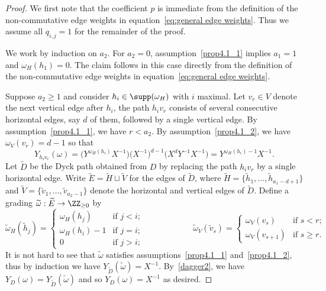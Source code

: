 \begin{proof}
 We first note that the coefficient $p$ is immediate from the definition of the non-commutative edge weights in equation~\eqref{eq:general edge weights}. 
 Thus we assume all $q_{i,j}=1$ for the remainder of the proof.

 We work by induction on $a_2$. 
 For $a_2=0$, assumption~\ref{prop4.1_1} implies $a_1=1$ and $\omega_H(h_1)=0$. 
 The claim follows in this case directly from the definition of the non-commutative edge weights in equation~\eqref{eq:general edge weights}.

 Suppose $a_2\ge1$ and consider $h_i\in\supp(\omega_H)$ with $i$ maximal.
 Let $v_r\in V$ denote the next vertical edge after $h_i$, \ie the path $h_iv_r$ consists of several consecutive horizontal edges, say $d$ of them, followed by a single vertical edge.
 By assumption~\ref{prop4.1_1}, we have $r<a_2$.
 By assumption~\ref{prop4.1_2}, we have $\omega_V(v_r)=d-1$ so that 
 \begin{equation}\label{dagger2}
 \tag{$\dagger$}
 Y_{h_iv_r}(\omega)=\big(Y^{\omega_H(h_i)}X^{-1}\big)\big(X^{-1}\big)^{d-1}\big(X^dY^{-1}X^{-1}\big)=Y^{\omega_H(h_i)-1}X^{-1}.
 \end{equation}
 Let $\widetilde D$ be the Dyck path obtained from $D$ by replacing the path $h_iv_r$ by a single horizontal edge.
 Write $\widetilde E=\widetilde H\sqcup\widetilde V$ for the edges of $\widetilde D$, where $\widetilde H=\{\tilde h_1,\ldots,\tilde h_{a_1-d+1}\}$ and $\widetilde V=\{\tilde v_1,\ldots,\tilde v_{a_2-1}\}$ denote the horizontal and vertical edges of $\widetilde D$.
 Define a grading $\widetilde\omega:\widetilde E\to\ZZ_{\ge0}$ by
 \[\widetilde\omega_H(\tilde h_j)=\begin{cases} \omega_H(h_j) & \text{if $j<i$;}\\ \omega_H(h_i)-1 & \text{if $j=i$;}\\ 0 & \text{if $j>i$;}\end{cases}
 \hspace{1in}
 \widetilde\omega_V(\tilde v_s)=\begin{cases} \omega_V(v_s) & \text{if $s<r$;}\\ \omega_V(v_{s+1}) & \text{if $s\ge r$.}\end{cases}\]
 It is not hard to see that $\widetilde\omega$ satisfies assumptions~\ref{prop4.1_1} and~\ref{prop4.1_2}, thus by induction we have $Y_{\widetilde D}(\widetilde\omega)=X^{-1}$.
 By~\eqref{dagger2}, we have $Y_D(\omega)=Y_{\widetilde D}(\widetilde\omega)$ and so $Y_D(\omega)=X^{-1}$ as desired.
\end{proof}

